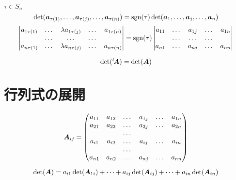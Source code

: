 \documentclass[leqno,autodetect-engine, dvipdfmx-if-dvi,ja=standard]{bxjsarticle}
\begin{document}
		\begin{thm} $\tau \in S_n$
			\begin{equation}
				\det(\boldsymbol{a}_{\tau(1)}, \dots, \boldsymbol{a}_{\tau(j)}, \dots, \boldsymbol{a}_{\tau(n)}) = \operatorname{\mathrm{sgn}}(\tau) \det(\boldsymbol{a}_1, \dots, \boldsymbol{a}_j, \dots, \boldsymbol{a}_n)
			\end{equation}
			\begin{equation}
				\begin{vmatrix}
					a_{1 \tau(1)} & \dots & \lambda a_{1 \tau(j)} & \dots & a_{1 \tau(n)} \\
					& \dots &   \dots                & \dots &           \\
					a_{n \tau(1)} & \dots & \lambda a_{n \tau(j)}  & \dots & a_{n \tau(n)}
				\end{vmatrix} 
				= \operatorname{\mathrm{sgn}}(\tau)
				\begin{vmatrix}
					a_{1 1} & \dots & a_{1 j} & \dots & a_{1 n} \\
					& \dots &   \dots                & \dots &           \\
					a_{n 1} & \dots & a_{n j} & \dots & a_{n n}
				\end{vmatrix} 
			\end{equation}
		\end{thm}

		\begin{thm}
			\begin{equation}
				\det({}^t\!\boldsymbol{A}) = \det(\boldsymbol{A})
			\end{equation}
		\end{thm}

	
	\section{行列式の展開}
		\begin{dfn}
			\begin{equation}
				\boldsymbol{A}_{i j} = \begin{pmatrix}
						a_{1 1} & a_{1 2} & \dots & a_{1 j} & \dots & a_{1 n} \\
						a_{2 1} & a_{2 2} & \dots & a_{2 j} & \dots & a_{2 n} \\
						            &            & \dots &      &     & \\
					   a_{i 1} & a_{i 2} & \dots & a_{i j} & \dots & a_{i n} \\
						            &            & \dots &      &     & \\
						a_{n 1} & a_{n 2} & \dots & a_{n j} & \dots & a_{n n} \\          
					\end{pmatrix}
			\end{equation}
		\end{dfn}
	
		\begin{thm}
			\begin{equation}
				\det(\boldsymbol{A}) = a_{i 1} \det(\boldsymbol{A}_{1 i}) + \dots + a_{i j} \det(\boldsymbol{A}_{i j}) + \dots + a_{i n} \det(\boldsymbol{A}_{i n})
			\end{equation}
		\end{thm}
\end{document}

